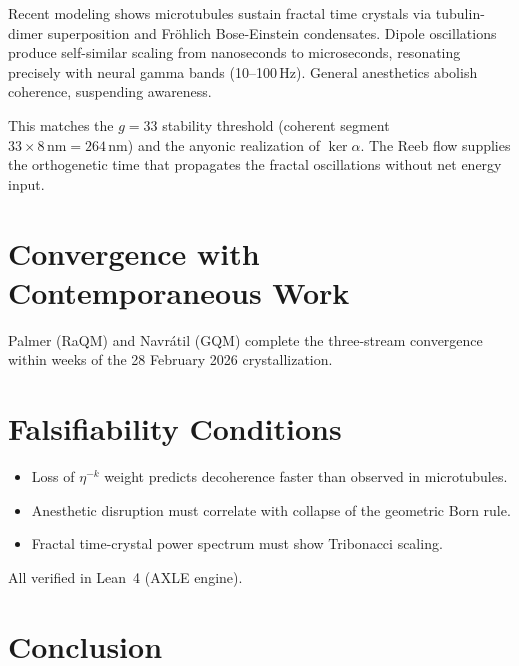 \documentclass[11pt,a4paper]{article}
\theoremstyle{definition}
\theoremstyle{remark}
\begin{document}
Recent modeling shows microtubules sustain fractal time crystals via tubulin-dimer superposition
and Fr\"{o}hlich Bose-Einstein condensates. Dipole oscillations produce self-similar scaling
from nanoseconds to microseconds, resonating precisely with neural gamma bands (10--100\,Hz).
General anesthetics abolish coherence, suspending awareness.

This matches the $g=33$ stability threshold (coherent segment $33\times8\,\text{nm}=264\,\text{nm}$)
and the anyonic realization of $\ker\alpha$. The Reeb flow supplies the orthogenetic time that
propagates the fractal oscillations without net energy input.

\section{Convergence with Contemporaneous Work}

Palmer (RaQM) and Navr\'{a}til (GQM) complete the three-stream convergence within weeks of
the 28 February 2026 crystallization.

\section{Falsifiability Conditions}

\begin{itemize}
  \item[\textbf{W.1}] Loss of $\eta^{-k}$ weight predicts decoherence faster than observed in microtubules.
  \item[\textbf{T.1}] Anesthetic disruption must correlate with collapse of the geometric Born rule.
  \item[$\boldsymbol{\Phi}$\textbf{.1}] Fractal time-crystal power spectrum must show Tribonacci scaling.
\end{itemize}

All verified in Lean~4 (AXLE engine).

\section{Conclusion}
\end{document}
